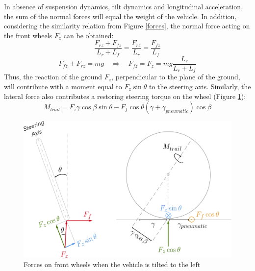 In absence of suspension dynamics, tilt dynamics and longitudinal acceleration, the sum of the normal forces will equal the weight of the vehicle. In addition, considering the similarity relation from Figure \ref{forces}, the normal force acting on the front wheels $F_{z}$ can be obtained:
\[\frac{F_{rz}+F_{fz}}{L_{r}+L_{f}}=\frac{F_{rz}}{L_{r}}=\frac{F_{fz}}{L_{f}}\]
\begin{equation}
F_{fz}+F_{rz}=mg \quad \Rightarrow \quad F_{fz}= F_{z}=mg \frac{L_{r}}{L_{r}+L_{f}}
\end{equation}
Thus, the reaction of the ground $F_{z}$, perpendicular to the plane of the ground, will contribute with a moment equal to $F_{z}\sin\theta$ to the steering axis. Similarly, the lateral force also contributes a restoring steering torque on the wheel (Figure \ref{trail_2}):
\begin{equation}
M_{trail}=F_{z}\gamma\cos\beta\sin\theta-F_{f}\cos\theta(\gamma+\gamma_{pneumatic})\cos\beta
\end{equation}

\begin{figure}
	\includegraphics[width=1.1\linewidth]{figs/02/trail_2}
	\caption{Forces on front wheels when the vehicle is tilted to the left}
	\label{trail_2}
\end{figure}



